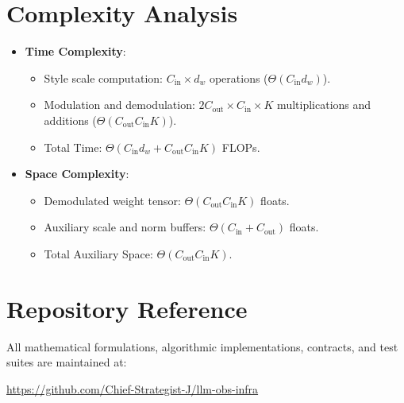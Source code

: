 \documentclass[11pt,a4paper]{article}
\theoremstyle{definition}
\begin{document}
\section{Complexity Analysis}
\begin{itemize}
    \item \textbf{Time Complexity}:
    \begin{itemize}
        \item Style scale computation: $C_{\text{in}} \times d_w$ operations ($\Theta(C_{\text{in}} d_w)$).
        \item Modulation and demodulation: $2 C_{\text{out}} \times C_{\text{in}} \times K$ multiplications and additions ($\Theta(C_{\text{out}} C_{\text{in}} K)$).
        \item Total Time: $\Theta(C_{\text{in}} d_w + C_{\text{out}} C_{\text{in}} K)$ FLOPs.
    \end{itemize}
    \item \textbf{Space Complexity}:
    \begin{itemize}
        \item Demodulated weight tensor: $\Theta(C_{\text{out}} C_{\text{in}} K)$ floats.
        \item Auxiliary scale and norm buffers: $\Theta(C_{\text{in}} + C_{\text{out}})$ floats.
        \item Total Auxiliary Space: $\Theta(C_{\text{out}} C_{\text{in}} K)$.
    \end{itemize}
\end{itemize}

\section{Repository Reference}
All mathematical formulations, algorithmic implementations, contracts, and test suites are maintained at:
\begin{center}
\url{https://github.com/Chief-Strategist-J/llm-obs-infra}
\end{center}
\end{document}
